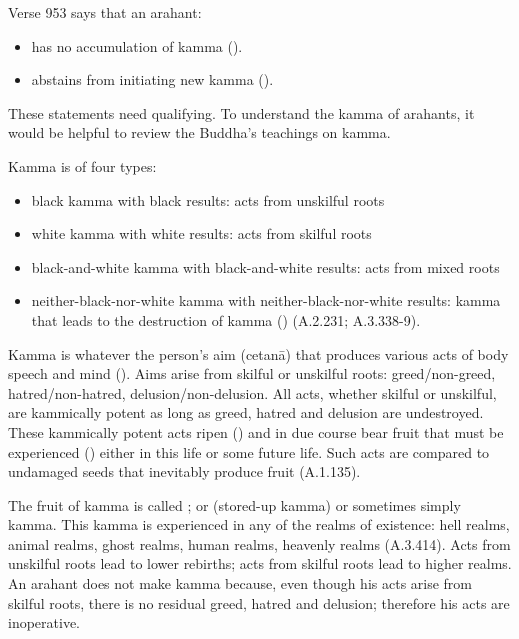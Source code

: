 
Verse 953 says that an arahant:

\begin{itemize}
\item has no accumulation of kamma ().
\item abstains from initiating new kamma ().
\end{itemize}

These statements need qualifying. To understand the kamma of arahants, it would be helpful to review the Buddha's teachings on kamma.

Kamma is of four types:

\begin{itemize}
\item black kamma with black results: acts from unskilful roots
\item white kamma with white results: acts from skilful roots
\item black-and-white kamma with black-and-white results: acts from mixed roots
\item neither-black-nor-white kamma with neither-black-nor-white results: kamma that leads to the destruction of kamma () (A.2.231; A.3.338-9).
\end{itemize}

Kamma is whatever the person's aim (cetanā) that produces various acts of body speech and mind (). Aims arise from skilful or unskilful roots: greed/non-greed, hatred/non-hatred, delusion/non-delusion. All acts, whether skilful or unskilful, are kammically potent as long as greed, hatred and delusion are undestroyed. These kammically potent acts ripen () and in due course bear fruit that must be experienced () either in this life or some future life. Such acts are compared to undamaged seeds that inevitably produce fruit (A.1.135).

The fruit of kamma is called ; or  (stored-up kamma) or sometimes simply kamma. This kamma is experienced in any of the realms of existence: hell realms, animal realms, ghost realms, human realms, heavenly realms (A.3.414). Acts from unskilful roots lead to lower rebirths; acts from skilful roots lead to higher realms. An arahant does not make kamma because, even though his acts arise from skilful roots, there is no residual greed, hatred and delusion; therefore his acts are inoperative.

